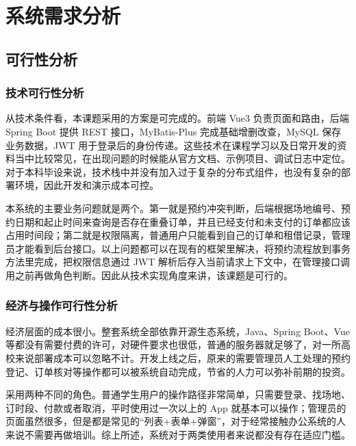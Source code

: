 
\chapter{系统需求分析}

\section{可行性分析}

\subsection{技术可行性分析}

从技术条件看，本课题采用的方案是可完成的。前端 Vue3 负责页面和路由，后端 Spring Boot 提供 REST 接口，MyBatis-Plus 完成基础增删改查，MySQL 保存业务数据，JWT 用于登录后的身份传递。这些技术在课程学习以及日常开发的资料当中比较常见，在出现问题的时候能从官方文档、示例项目、调试日志中定位。对于本科毕设来说，技术栈中并没有加入过于复杂的分布式组件，也没有复杂的部署环境，因此开发和演示成本可控。

本系统的主要业务问题就是两个。第一就是预约冲突判断，后端根据场地编号、预约日期和起止时间来查询是否存在重叠订单，并且已经支付和未支付的订单都应该占用时间段；第二就是权限隔离，普通用户只能看到自己的订单和租借记录，管理员才能看到后台接口。以上问题都可以在现有的框架里解决，将预约流程放到事务方法里完成，把权限信息通过 JWT 解析后存入当前请求上下文中，在管理接口调用之前再做角色判断。因此从技术实现角度来讲，该课题是可行的。

\subsection{经济与操作可行性分析}

经济层面的成本很小。整套系统全部依靠开源生态系统，Java、Spring Boot、Vue 等都没有需要付费的许可，对硬件要求也很低，普通的服务器就足够了，对一所高校来说部署成本可以忽略不计。开发上线之后，原来的需要管理员人工处理的预约登记、订单核对等操作都可以被系统自动完成，节省的人力可以弥补前期的投资。

采用两种不同的角色。普通学生用户的操作路径非常简单，只需要登录、找场地、订时段、付款或者取消，平时使用过一次以上的 App 就基本可以操作；管理员的页面虽然很多，但是都是常见的“列表+表单+弹窗”，对于经常接触办公系统的人来说不需要再做培训。综上所述，系统对于两类使用者来说都没有存在适应门槛。

